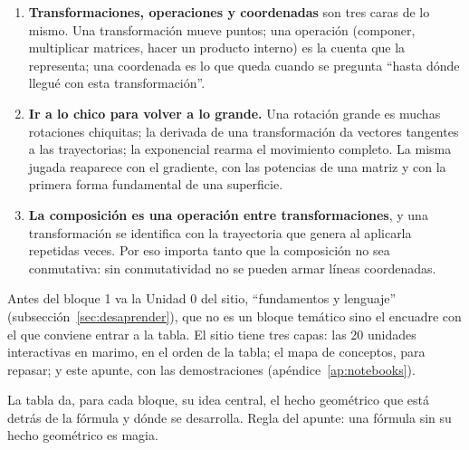 \begin{idea}
\begin{enumerate}
  \item \textbf{Transformaciones, operaciones y coordenadas} son tres caras de lo mismo. Una
  transformación mueve puntos; una operación (componer, multiplicar matrices, hacer un
  producto interno) es la cuenta que la representa; una coordenada es lo que queda cuando se
  pregunta \enquote{hasta dónde llegué con esta transformación}.
  \item \textbf{Ir a lo chico para volver a lo grande.} Una rotación grande es muchas
  rotaciones chiquitas; la derivada de una transformación da vectores tangentes a las
  trayectorias; la exponencial rearma el movimiento completo. La misma jugada reaparece con
  el gradiente, con las potencias de una matriz y con la primera forma fundamental de una
  superficie.
  \item \textbf{La composición es una operación entre transformaciones}, y una
  transformación se identifica con la trayectoria que genera al aplicarla repetidas veces.
  Por eso importa tanto que la composición no sea conmutativa: sin conmutatividad no se
  pueden armar líneas coordenadas.
\end{enumerate}
\end{idea}

Antes del bloque 1 va la Unidad 0 del sitio, \enquote{fundamentos y lenguaje}
(subsección~\ref{sec:desaprender}), que no es un bloque temático sino el encuadre con el que
conviene entrar a la tabla. El sitio tiene tres capas: las 20 unidades interactivas en
marimo, en el orden de la tabla; el mapa de conceptos, para repasar; y este apunte, con las
demostraciones (apéndice~\ref{ap:notebooks}).

La tabla da, para cada bloque, su idea central, el hecho geométrico que está detrás de la
fórmula y dónde se desarrolla. Regla del apunte: una fórmula sin su hecho geométrico es magia.

